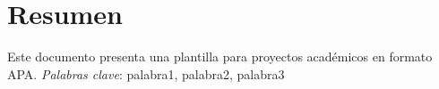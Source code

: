 \chapter*{Resumen}
Este documento presenta una plantilla para proyectos académicos en formato APA.
\textit{Palabras clave}: palabra1, palabra2, palabra3

\tableofcontents
\thispagestyle{empty}

\listoffigures
\thispagestyle{empty}

\listoftables
\thispagestyle{empty}